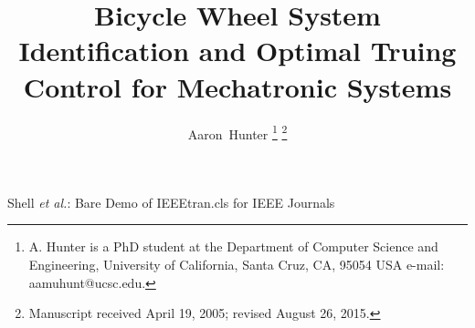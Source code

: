 \documentclass[journal]{IEEEtran}
\begin{document}
%
\title{Bicycle Wheel System Identification and Optimal Truing Control for Mechatronic Systems}
%
%
%

\author{Aaron~Hunter%
\thanks{A. Hunter is a PhD student at the Department of Computer Science and Engineering, University of California, Santa Cruz, CA, 95054 USA e-mail: aamuhunt@ucsc.edu.}%
\thanks{Manuscript received April 19, 2005; revised August 26, 2015.}}

% 
%



%
{Shell \MakeLowercase{\textit{et al.}}: Bare Demo of IEEEtran.cls for IEEE Journals}
% 
\end{document}
